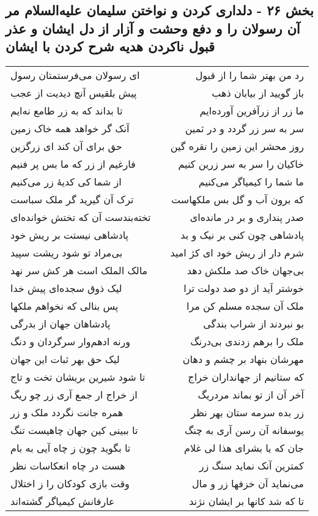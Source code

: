 \begin{center}
\section*{بخش ۲۶ - دلداری کردن و نواختن سلیمان علیه‌السلام مر آن رسولان را  و دفع وحشت و آزار از دل ایشان و عذر قبول ناکردن هدیه شرح  کردن با ایشان}
\label{sec:sh026}
\begin{longtable}{l p{0.5cm} r}
ای رسولان می‌فرستمتان رسول
&&
رد من بهتر شما را از قبول
\\
پیش بلقیس آنچ دیدیت از عجب
&&
باز گویید از بیابان ذهب
\\
تا بداند که به زر طامع نه‌ایم
&&
ما زر از زرآفرین آورده‌ایم
\\
آنک گر خواهد همه خاک زمین
&&
سر به سر زر گردد و در ثمین
\\
حق برای آن کند ای زرگزین
&&
روز محشر این زمین را نقره گین
\\
فارغیم از زر که ما بس پر فنیم
&&
خاکیان را سر به سر زرین کنیم
\\
از شما کی کدیهٔ زر می‌کنیم
&&
ما شما را کیمیاگر می‌کنیم
\\
ترک آن گیرید گر ملک سباست
&&
که برون آب و گل بس ملکهاست
\\
تخته‌بندست آن که تختش خوانده‌ای
&&
صدر پنداری و بر در مانده‌ای
\\
پادشاهی نیستت بر ریش خود
&&
پادشاهی چون کنی بر نیک و بد
\\
بی‌مراد تو شود ریشت سپید
&&
شرم دار از ریش خود ای کژ امید
\\
مالک الملک است هر کش سر نهد
&&
بی‌جهان خاک صد ملکش دهد
\\
لیک ذوق سجده‌ای پیش خدا
&&
خوشتر آید از دو صد دولت ترا
\\
پس بنالی که نخواهم ملکها
&&
ملک آن سجده مسلم کن مرا
\\
پادشاهان جهان از بدرگی
&&
بو نبردند از شراب بندگی
\\
ورنه ادهم‌وار سرگردان و دنگ
&&
ملک را برهم زدندی بی‌درنگ
\\
لیک حق بهر ثبات این جهان
&&
مهرشان بنهاد بر چشم و دهان
\\
تا شود شیرین بریشان تخت و تاج
&&
که ستانیم از جهانداران خراج
\\
از خراج ار جمع آری زر چو ریگ
&&
آخر آن از تو بماند مردریگ
\\
همره جانت نگردد ملک و زر
&&
زر بده سرمه ستان بهر نظر
\\
تا ببینی کین جهان چاهیست تنگ
&&
یوسفانه آن رسن آری به چنگ
\\
تا بگوید چون ز چاه آیی به بام
&&
جان که یا بشرای هذا لی غلام
\\
هست در چاه انعکاسات نظر
&&
کمترین آنک نماید سنگ زر
\\
وقت بازی کودکان را ز اختلال
&&
می‌نماید آن خزفها زر و مال
\\
عارفانش کیمیاگر گشته‌اند
&&
تا که شد کانها بر ایشان نژند
\\
\end{longtable}
\end{center}
